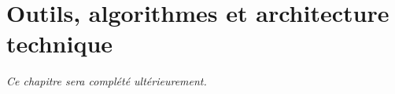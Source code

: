 \documentclass[../main.tex]{subfiles}
\begin{document}
\chapter{Outils, algorithmes et architecture technique}
\label{chap:outils}

\vspace{2cm}
\begin{center}
\textit{Ce chapitre sera complété ultérieurement.}
\end{center}

\clearpage

\end{document}
